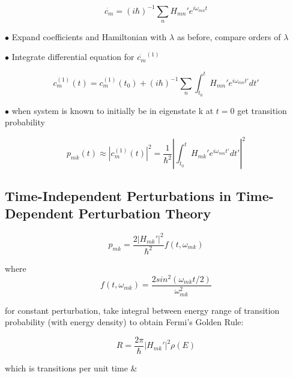 \documentclass[table,cmyk]{article}
\begin{document}
\begin{longtable}
\[\dot{c_m} = (i\hbar)^{-1}\sum_{n }H_{mn}'e^{i\omega_{mn}t}\]

$\bullet$ Expand coefficients and Hamiltonian with $\lambda$ as before, compare orders of $\lambda$

$\bullet$ Integrate differential equation for $\dot{c_m}^{(1)}$

\[c_m^{(1)}(t) = c_m^{(1)}(t_0) + (i\hbar)^{-1}\sum_{n } \int_{t_0}^{t} H_{mn}'e^{i\omega_{mn}t'}dt'\]

$\bullet$ when system is known to initially be in eigenstate k at $t=0$ get transition probability

\[p_{mk}(t) \approx \left|c_m^{(1)}(t)\right|^2 = \frac{1}{\hbar^2}\left|\int_{t_0}^{t}H_{mk}'e^{i\omega_{mn}t'}dt'\right|^2\]
\subsection*{Time-Independent Perturbations in Time-Dependent Perturbation Theory}

\[p_{mk} = \frac{2|H_{mk}'|^2}{\hbar^2} f(t,\omega_{mk})\]

where \[f(t,\omega_{mk}) = \frac{2sin^2(\omega_{mk}t/2)}{\omega_{mk}^2}\]

for constant perturbation, take integral between energy range of transition probability (with energy density) to obtain Fermi's Golden Rule:

\[R = \frac{2\pi}{\hbar} |H_{mk}'|^2 \rho(E)\]

which is transitions per unit time
&
\tabularnewline\hline



\end{longtable}
\end{document}
